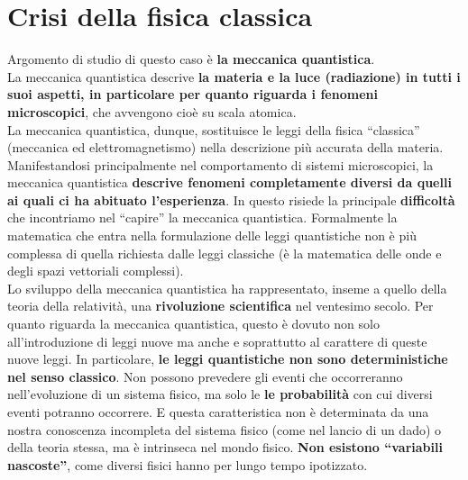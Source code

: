 \documentclass[a4paper,12pt,oneside]{book}
\newcommand*{\myfont}{\fontfamily{ppl}\selectfont}
\begin{document}
\fancypagestyle{plain}{%
\fancyhf{} %
\fancyfoot[C]{\bfseries \myfont{\thepage}} %
\renewcommand{\headrulewidth}{0pt}
\renewcommand{\footrulewidth}{0pt}}

\fancypagestyle{VS}{
\headheight = 15pt
\lhead[\myfont{\textit{\textbf{\thechapter\nouppercase{\leftmark}}}}]{\myfont{\textit{\textbf{\nouppercase{\leftmark}}}}}
\chead[]{}
\rhead[\myfont{\textbf{\thepage}}]{\myfont{\textbf{\thepage}}}

\lfoot[]{}
\cfoot[]{}
\rfoot[]{}
}



\pagestyle{VS}
\chapter{Crisi della fisica classica}
Argomento di studio di questo caso è \textbf{la meccanica quantistica}.\\
La meccanica quantistica descrive \textbf{la materia e la luce (radiazione) in tutti i suoi aspetti, in particolare per quanto riguarda i fenomeni microscopici}, che avvengono cioè su scala atomica.\\
La meccanica quantistica, dunque, sostituisce le leggi della fisica ``classica'' (meccanica ed elettromagnetismo) nella descrizione più accurata della materia. Manifestandosi principalmente nel comportamento di sistemi microscopici, la meccanica quantistica \textbf{descrive fenomeni completamente diversi da quelli ai quali ci ha abituato l'esperienza}. In questo risiede la principale \textbf{difficoltà} che incontriamo nel ``capire'' la meccanica quantistica. Formalmente la matematica che entra nella formulazione delle leggi quantistiche non è più complessa di quella richiesta dalle leggi classiche (è la matematica delle onde e degli spazi vettoriali complessi).\\
Lo sviluppo della meccanica quantistica ha rappresentato, inseme a quello della teoria della relatività, una \textbf{rivoluzione scientifica} nel ventesimo secolo. Per quanto riguarda la meccanica quantistica, questo è dovuto non solo all'introduzione di leggi nuove ma anche e soprattutto al carattere di queste nuove leggi. In particolare, \textbf{le leggi quantistiche non sono deterministiche nel senso classico}. Non possono prevedere gli eventi che occorreranno nell'evoluzione di un sistema fisico, ma solo le \textbf{le probabilità} con cui diversi eventi potranno occorrere. E questa caratteristica non è determinata da una nostra conoscenza incompleta del sistema fisico (come nel lancio di un dado) o della teoria stessa, ma è intrinseca nel mondo fisico. \textbf{Non esistono ``variabili nascoste''}, come diversi fisici hanno per lungo tempo ipotizzato.\\
\end{document}
